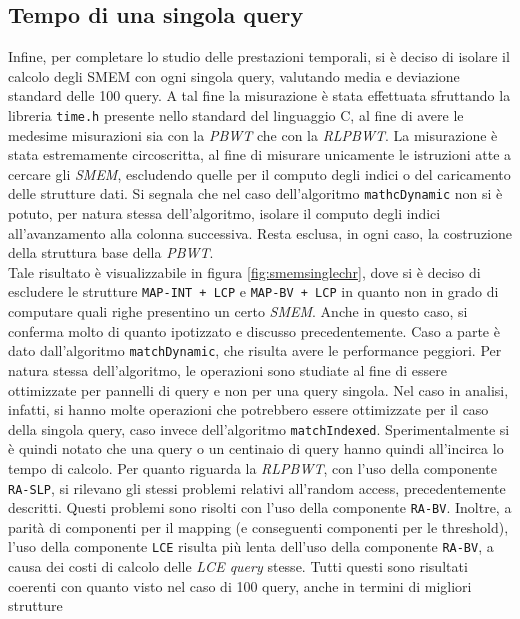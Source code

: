 \subsection{Tempo di una singola query}
Infine, per completare lo studio delle prestazioni temporali, si è deciso di
isolare il calcolo degli SMEM con ogni singola query, valutando media e
deviazione standard delle 100 query. A tal fine la misurazione è stata
effettuata sfruttando la libreria \texttt{time.h} presente nello standard del
linguaggio C, al fine di avere le medesime misurazioni sia con la \textit{PBWT}
che con la \textit{RLPBWT}. La misurazione è stata estremamente circoscritta, al
fine di misurare unicamente le istruzioni atte a cercare gli \textit{SMEM},
escludendo quelle per il computo degli indici o del caricamento delle strutture
dati.
Si segnala che nel caso dell'algoritmo \texttt{mathcDynamic} non si è
potuto, per natura stessa dell'algoritmo, isolare il computo degli indici
all'avanzamento alla colonna successiva. Resta esclusa, in ogni caso, la
costruzione della struttura base della \textit{PBWT}.
\\
Tale risultato è visualizzabile in figura
\ref{fig:smemsinglechr}, dove si è deciso di escludere le strutture
\texttt{MAP-INT + LCP} e \texttt{MAP-BV + LCP} in quanto non in grado di
computare quali righe presentino un certo \textit{SMEM}. Anche in questo caso,
si conferma molto di quanto ipotizzato e discusso precedentemente. Caso a parte
è dato dall'algoritmo \texttt{matchDynamic}, che risulta avere le performance
peggiori. Per natura stessa dell'algoritmo, 
le operazioni sono studiate al fine di essere ottimizzate per pannelli di query
e non per una query singola. Nel caso in analisi, infatti, si hanno molte
operazioni che potrebbero essere ottimizzate per il caso della singola
query, caso invece dell'algoritmo \texttt{matchIndexed}. Sperimentalmente si è
quindi notato che una query o un centinaio di query hanno quindi all'incirca lo
tempo di calcolo. Per quanto riguarda la \textit{RLPBWT}, con l'uso della
componente \texttt{RA-SLP}, si rilevano gli stessi problemi relativi all'random
access, precedentemente descritti. Questi problemi sono risolti con l'uso della
componente \texttt{RA-BV}. Inoltre, a parità di componenti per il mapping (e
conseguenti componenti per le threshold), l'uso della componente \texttt{LCE}
risulta più lenta dell'uso della componente \texttt{RA-BV}, a causa dei costi di
calcolo delle \textit{LCE query} stesse. Tutti questi sono risultati coerenti
con quanto visto nel caso di 100 query, anche in termini di migliori strutture
